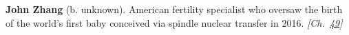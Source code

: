 \textbf{John Zhang} (b. unknown). American fertility specialist who oversaw the birth of the world's first baby conceived via spindle nuclear transfer in 2016. \emph{[Ch.~\hyperref[ch:ivfmtdna]{49}]}

